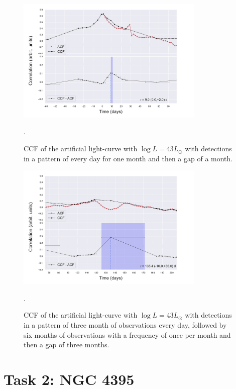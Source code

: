 \documentclass[letterpaper, oneside]{article}
\begin{document}
\begin{figure}[p]
	\centering
	\includegraphics[width=0.8\textwidth]{../artificial_x_y_month.pdf}
	\caption{CCF of the artificial light-curve with $\log L = 43 L_{\odot}$ with detections in a pattern of every day for one month and then a gap of a month.}.
	\label{fig:ccf_art_lc_L43_month}
\end{figure}

\begin{figure}[p]
	\centering
	\includegraphics[width=0.8\textwidth]{../artificial_x_y_lgaps.pdf}
	\caption{CCF of the artificial light-curve with $\log L = 43 L_{\odot}$ with detections in a pattern of three month of observations every day, followed by six months of observations with a frequency of once per month and then a gap of three months.}.
	\label{fig:ccf_art_lc_L43_lgaps}
\end{figure}


\section*{Task 2: NGC 4395}






\end{document}
